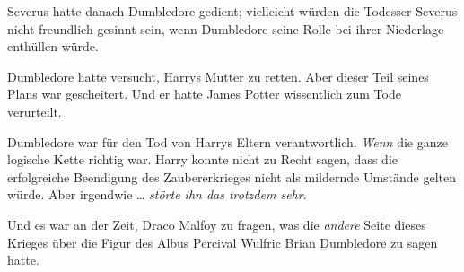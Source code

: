 Severus hatte danach Dumbledore gedient; vielleicht würden die Todesser Severus nicht freundlich gesinnt sein, wenn Dumbledore seine Rolle bei ihrer Niederlage enthüllen würde.

Dumbledore hatte versucht, Harrys Mutter zu retten. Aber dieser Teil seines Plans war gescheitert. Und er hatte James Potter wissentlich zum Tode verurteilt.

Dumbledore war für den Tod von Harrys Eltern verantwortlich. \emph{Wenn} die ganze logische Kette richtig war. Harry konnte nicht zu Recht sagen, dass die erfolgreiche Beendigung des Zaubererkrieges nicht als mildernde Umstände gelten würde. Aber irgendwie … \emph{störte ihn das trotzdem sehr}.

Und es war an der Zeit, Draco Malfoy zu fragen, was die \emph{andere} Seite dieses Krieges über die Figur des Albus Percival Wulfric Brian Dumbledore zu sagen hatte.

